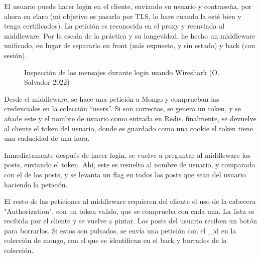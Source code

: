 \documentclass[11pt]{article}
\begin{document}
\begin{flushleft}
		
	\clearpage
		El usuario puede hacer login en el cliente, enviando su usuario y contraseña, por ahora en claro (mi objetivo es pasarlo por TLS, lo hare cuando la esté bien y tenga certificados). La petición es reconocida en el proxy y reenviada al middleware. Por la escala de la práctica y su longevidad, he hecho un middleware unificado, en lugar de separarlo en front (más expuesto, y sin estado) y back (con sesión). 
		\linebreak
		
			\begin{figure}[htb]
				\centering
				\caption{Inspección de los mensajes durante login usando Wireshark (O. Salvador 2022)}
			\end{figure}	

		Desde el middleware, se hace una petición a Mongo y comprueban las credenciales en la colección ``users''. Si son correctos, se genera un token, y se añade este y el nombre de usuario como entrada en Redis. finalmente, se devuelve al cliente el token del usuario, donde es guardado como una cookie el token tiene una caducidad de una hora. 
		\linebreak
		
		Inmediatamente después de hacer login, se vuelve a preguntar al middleware los posts, enviando el token. Ahí, este es resuelto al nombre de usuario, y comparado con el de los posts, y se levanta un flag en todos los posts que sean del usuario haciendo la petición.  
		\linebreak
 
		El resto de las peticiones al middleware requieren del cliente el uso de la cabecera "Authorization", con un token valido, que se comprueba con cada una. La lista es recibida por el cliente y se vuelve a pintar. Los posts del usuario reciben un botón para borrarlos. Si estos son pulsados, se envía una petición con el \_id en la colección de mongo, con el que se identifican en el back y borrados de la colección. 
		\linebreak
		

\end{flushleft}
\end{document}

